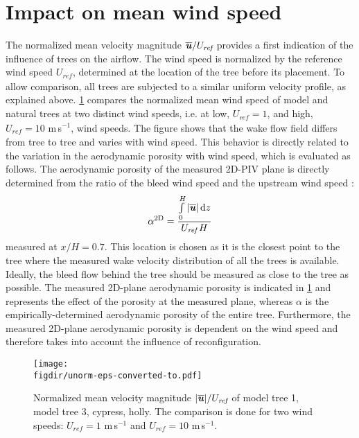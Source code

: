 \section{Impact on mean wind speed}

The normalized mean velocity magnitude $\overline{\textbf{\textit{u}}}/U_{\textit{ref}}$ provides a first indication of the influence of trees on the airflow. The wind speed is normalized by the reference wind speed $U_{\textit{ref}}$, determined at the location of the tree before its placement. To allow comparison, all trees are subjected to a similar uniform velocity profile, as explained above. \cref{fig:unorm} compares the normalized mean wind speed of model and natural trees at two distinct wind speeds, i.e. at low, $U_{\textit{ref}}=1$, and high, $U_{\textit{ref}}=10$ m\,s$^{-1}$, wind speeds. The figure shows that the wake flow field differs from tree to tree and varies with wind speed. This behavior is directly related to the variation in the aerodynamic porosity with wind speed, which is evaluated as follows. The aerodynamic porosity of the measured 2D-PIV plane is directly determined from the ratio of the bleed wind speed and the upstream wind speed \citep{Guan2003}:
\begin{equation}
\alpha^{\mathrm{2D}} = \frac{\int\limits_0^H { |{\overline{\textbf{\textit{u}}}}|\,\mathrm{d}z}}{U_{\textit{ref}} \, H}
\label{eq:2dporosity}
\end{equation}
measured at $x/H=0.7$. This location is chosen as it is the closest point to the tree where the measured wake velocity distribution of all the trees is available. Ideally, the bleed flow behind the tree should be measured as close to the tree as possible. The measured 2D-plane aerodynamic porosity is indicated in \cref{fig:unorm} and represents the effect of the porosity at the measured plane, whereas $\alpha$ is the empirically-determined aerodynamic porosity of the entire tree. Furthermore, the measured 2D-plane aerodynamic porosity is dependent on the wind speed and therefore takes into account the influence of reconfiguration.

	\begin{sidewaysfigure}[p]
	\centering
	\texttt{[image: \\figdir/unorm-eps-converted-to.pdf]}
	\caption{Normalized mean velocity magnitude $|\overline{\textbf{\textit{u}}}|/U_{\textit{ref}}$ of  model tree 1,  model tree 3,  cypress,  holly. The comparison is done for two wind speeds:  $U_{\textit{ref}}=1$ m\,s$^{-1}$ and  $U_{\textit{ref}}=10$ m\,s$^{-1}$.}
	\label{fig:unorm}
	\end{sidewaysfigure}


